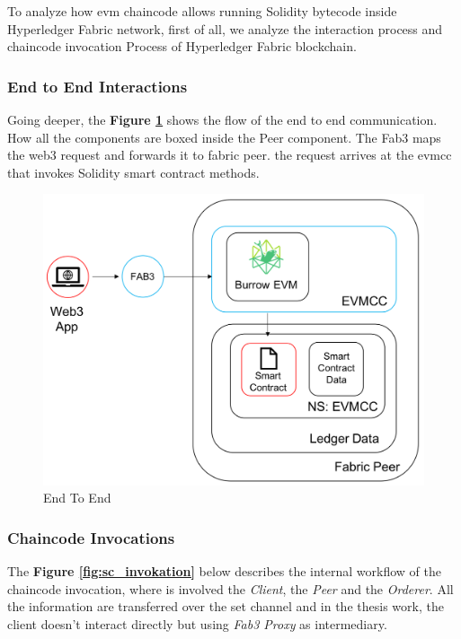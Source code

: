 To analyze how evm chaincode allows running Solidity bytecode inside Hyperledger Fabric network, first of all, we 
analyze the interaction process and chaincode invocation Process of Hyperledger Fabric blockchain. 

\subsubsection{End to End Interactions} 
Going deeper, the \textbf{Figure \ref{fig:end_to_end}} shows the flow of the end to end communication. How all the 
components are boxed inside the Peer component. The Fab3 maps the web3 request and forwards it to fabric peer. the request 
arrives at the evmcc that invokes Solidity smart contract methods.

\begin{figure}[h!]
    \centering
    \includegraphics[totalheight=7.5cm]{img/EndToEnd.png}
    \caption{End To End}
    \label{fig:end_to_end}
\end{figure}

\subsubsection{Chaincode Invocations}
The \textbf{Figure \ref{fig:sc_invokation}} below describes the internal workflow of the chaincode invocation, where is 
involved the \textit{Client}, the \textit{Peer} and the \textit{Orderer}. All the information are transferred over the 
set channel and in the thesis work, the client doesn't interact directly but using \textit{Fab3 Proxy}
as intermediary.

